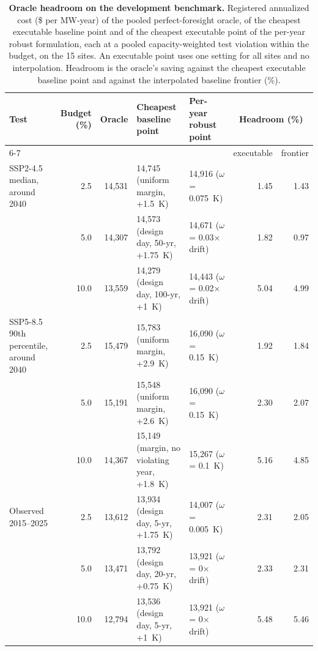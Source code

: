\begin{table}[htbp]
\centering
\footnotesize
\setlength{\tabcolsep}{3pt}
\caption{\textbf{Oracle headroom on the development benchmark.} Registered annualized cost (\$ per MW-year) of the pooled perfect-foresight oracle, of the cheapest executable baseline point and of the cheapest executable point of the per-year robust formulation, each at a pooled capacity-weighted test violation within the budget, on the 15 sites. An executable point uses one setting for all sites and no interpolation. Headroom is the oracle's saving against the cheapest executable baseline point and against the interpolated baseline frontier (\%).}\label{tab:s11}
\begin{tabular}{@{}p{27mm}rrp{40mm}p{33mm}rr@{}}
\toprule
Test & Budget (\%) & Oracle & Cheapest baseline point & Per-year robust point & \multicolumn{2}{c}{Headroom (\%)}\\
\cmidrule(l){6-7}
& & & & & executable & frontier\\
\midrule
SSP2-4.5 median, around 2040 & 2.5 & 14,531 & 14,745 (uniform margin, +1.5~K) & 14,916 ($\omega$ = 0.075~K) & 1.45 & 1.43 \\
 & 5.0 & 14,307 & 14,573 (design day, 50-yr, +1.75~K) & 14,671 ($\omega$ = 0.03$\times$ drift) & 1.82 & 0.97 \\
 & 10.0 & 13,559 & 14,279 (design day, 100-yr, +1~K) & 14,443 ($\omega$ = 0.02$\times$ drift) & 5.04 & 4.99 \\
\addlinespace
SSP5-8.5 90th percentile, around 2040 & 2.5 & 15,479 & 15,783 (uniform margin, +2.9~K) & 16,090 ($\omega$ = 0.15~K) & 1.92 & 1.84 \\
 & 5.0 & 15,191 & 15,548 (uniform margin, +2.6~K) & 16,090 ($\omega$ = 0.15~K) & 2.30 & 2.07 \\
 & 10.0 & 14,367 & 15,149 (margin, no violating year, +1.8~K) & 15,267 ($\omega$ = 0.1~K) & 5.16 & 4.85 \\
\addlinespace
Observed 2015--2025 & 2.5 & 13,612 & 13,934 (design day, 5-yr, +1.75~K) & 14,007 ($\omega$ = 0.005~K) & 2.31 & 2.05 \\
 & 5.0 & 13,471 & 13,792 (design day, 20-yr, +0.75~K) & 13,921 ($\omega$ = 0$\times$ drift) & 2.33 & 2.31 \\
 & 10.0 & 12,794 & 13,536 (design day, 5-yr, +1~K) & 13,921 ($\omega$ = 0$\times$ drift) & 5.48 & 5.46 \\
\bottomrule
\end{tabular}
\end{table}
